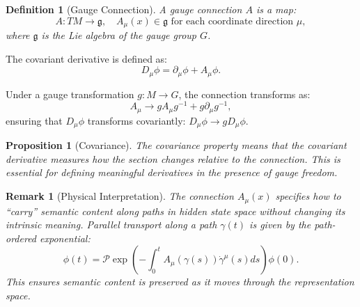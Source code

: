 \documentclass[12pt,letterpaper,twoside]{article}
\newtheorem{definition}{Definition}[section]
\newtheorem{remarque}{Remark}[section]
\newtheorem{prop}{Proposition}[section]
\begin{document}
\begin{definition}[Gauge Connection]
A gauge connection $A$ is a map:
\[
A: TM \to \mathfrak{g}, \quad A_\mu(x) \in \mathfrak{g} \text{ for each coordinate direction } \mu,
\]
where $\mathfrak{g}$ is the Lie algebra of the gauge group $G$.
\end{definition}

The covariant derivative is defined as:
\[
D_\mu \phi = \partial_\mu \phi + A_\mu \phi.
\]

Under a gauge transformation $g: M \to G$, the connection transforms as:
\[
A_\mu \to g A_\mu g^{-1} + g \partial_\mu g^{-1},
\]
ensuring that $D_\mu \phi$ transforms covariantly: $D_\mu \phi \to g D_\mu \phi$.

\begin{prop}[Covariance]
The covariance property means that the covariant derivative measures how the section changes relative to the connection. This is essential for defining meaningful derivatives in the presence of gauge freedom.
\end{prop}

\begin{remarque}[Physical Interpretation]
The connection $A_\mu(x)$ specifies how to ``carry'' semantic content along paths in hidden state space without changing its intrinsic meaning. Parallel transport along a path $\gamma(t)$ is given by the path-ordered exponential:
\[
\phi(t) = \mathcal{P} \exp\left(-\int_0^t A_\mu(\gamma(s)) \dot{\gamma}^\mu(s) ds\right) \phi(0).
\]
This ensures semantic content is preserved as it moves through the representation space.
\end{remarque}
\end{document}

